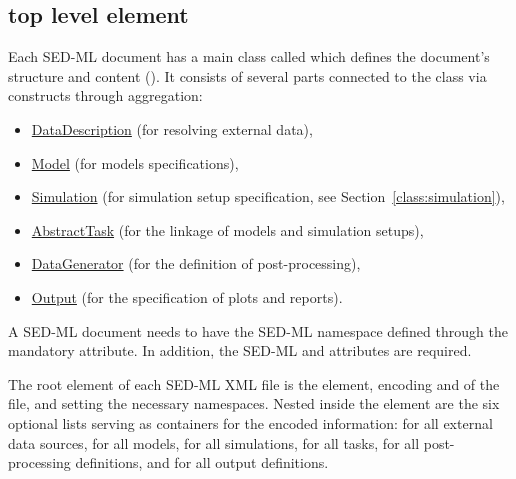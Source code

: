 \subsection{ top level element}
\label{class:sed-ml}
Each SED-ML \currentLV document has a main class called  which defines the document's structure and content (). It consists of several parts connected to the  class via \hyperref[sec:listOf]{} constructs through aggregation: 
\begin{itemize}
	\item \hyperref[class:dataDescription]{DataDescription} (for resolving external data), 
	\item \hyperref[class:model]{Model} (for models specifications),
	\item \hyperref[class:simulation]{Simulation} (for simulation setup specification, see Section~\ref{class:simulation}), 
	\item \hyperref[class:abstractTask]{AbstractTask} (for the linkage of models and simulation setups), 
	\item \hyperref[class:dataGenerator]{DataGenerator} (for the definition of post-processing),
	\item \hyperref[class:output]{Output} (for the specification of plots and reports).
\end{itemize}

A SED-ML document needs to have the SED-ML namespace defined through the mandatory \hyperref[sec:xmlns]{} attribute. In addition, the SED-ML \hyperref[sec:level]{} and \hyperref[sec:version]{} attributes are required.

The root element of each SED-ML XML file is the  element, encoding \hyperref[sec:level]{} and \hyperref[sec:version]{} of the file, and setting the necessary namespaces. Nested inside the  element are the six optional lists serving as containers for the encoded information: \hyperref[sec:listOfDataDescriptions]{} for all external data sources, \hyperref[sec:listOfModels]{} for all models, \hyperref[sec:listOfSimulations]{} for all simulations, \hyperref[sec:listOfTasks]{} for all tasks, \hyperref[sec:listOfDataGenerators]{} for all post-processing definitions, and \hyperref[sec:listOfOutputs]{} for all output definitions.

